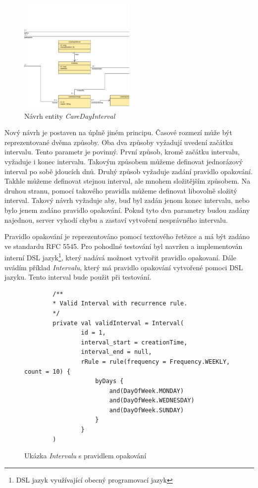     \begin{figure}\centering
	    \includegraphics[width=0.5\textwidth]{pdfs/CareDayInterval}
	    \caption[Návrh intervalu]{Návrh entity \textit{CareDayInterval}}\label{image:careDayInterval}
    \end{figure}
    
    Nový návrh je postaven na úplně jiném principu. Časové rozmezí může být reprezentované dvěma způsoby. Oba dva způsoby vyžadují uvedení začátku intervalu. Tento parametr je povinný. První způsob, kromě začátku intervalu, vyžaduje i konec intervalu. Takovým způsobem můžeme definovat jednorázový interval po sobě jdoucích dnů. Druhý způsob vyžaduje zadání pravidlo opakování. Takhle můžeme definovat stejnou interval, ale mnohem složitějším způsobem. Na druhou stranu, pomocí takového pravidla můžeme definovat libovolně složitý interval. Takový návrh vyžaduje aby, buď byl zadán jenom konec intervalu, nebo bylo jenem zadáno pravidlo opakování. Pokud tyto dva parametry budou zadány najednou, server vyhodí chybu a zastaví vytvoření nesprávného intervalu.
    
    Pravidlo opakování je reprezentováno pomocí textového řetězce a má být zadáno ve standardu {RFC 5545}\cite{recurrence-rule}. Pro pohodlné testování byl navržen a implementován {interní DSL jazyk}\footnote{DSL jazyk využívající obecný programovací jazyk}, který nadává možnost vytvořit pravidlo opakovaní. Dále uvádím příklad \textit{Intervalu}, který má pravidlo opakování vytvořené pomoci DSL jazyku. Tento interval bude použit při testování.
    \begin{figure}
        \begin{verbatim}
        /**
        * Valid Interval with recurrence rule.
        */
        private val validInterval = Interval(
                id = 1,
                interval_start = creationTime,
                interval_end = null,
                rRule = rule(frequency = Frequency.WEEKLY, count = 10) {
                    byDays {
                        and(DayOfWeek.MONDAY)
                        and(DayOfWeek.WEDNESDAY)
                        and(DayOfWeek.SUNDAY)
                    }
                }
        )
        \end{verbatim}
        \caption{Ukázka \textit{Intervalu} s pravidlem opakování} 
        \label{code:valid-interval}
        \end{figure}
